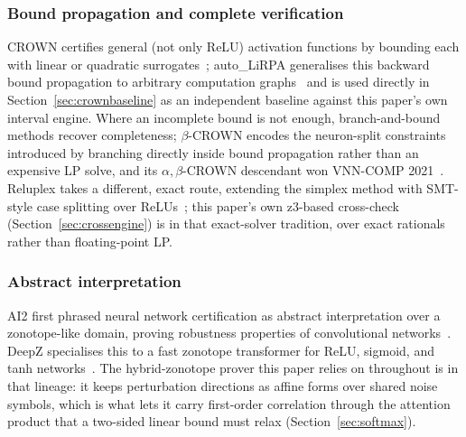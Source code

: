 \documentclass[10pt,journal]{IEEEtran}
\begin{document}
\subsubsection{Bound propagation and complete verification}
CROWN certifies general (not only ReLU) activation functions by bounding each with linear or quadratic surrogates~\cite{zhang2018crown}; auto\_LiRPA generalises this backward bound propagation to arbitrary computation graphs~\cite{xu2020autolirpa} and is used directly in Section~\ref{sec:crownbaseline} as an independent baseline against this paper's own interval engine. Where an incomplete bound is not enough, branch-and-bound methods recover completeness; $\beta$-CROWN encodes the neuron-split constraints introduced by branching directly inside bound propagation rather than an expensive LP solve, and its $\alpha,\beta$-CROWN descendant won VNN-COMP 2021~\cite{wang2021betacrown}. Reluplex takes a different, exact route, extending the simplex method with SMT-style case splitting over ReLUs~\cite{katz2017reluplex}; this paper's own z3-based cross-check (Section~\ref{sec:crossengine}) is in that exact-solver tradition, over exact rationals rather than floating-point LP.

\subsubsection{Abstract interpretation}
AI2 first phrased neural network certification as abstract interpretation over a zonotope-like domain, proving robustness properties of convolutional networks~\cite{gehr2018ai2}. DeepZ specialises this to a fast zonotope transformer for ReLU, sigmoid, and tanh networks~\cite{singh2019deepz}. The hybrid-zonotope prover this paper relies on throughout is in that lineage: it keeps perturbation directions as affine forms over shared noise symbols, which is what lets it carry first-order correlation through the attention product that a two-sided linear bound must relax (Section~\ref{sec:softmax}).
\end{document}
